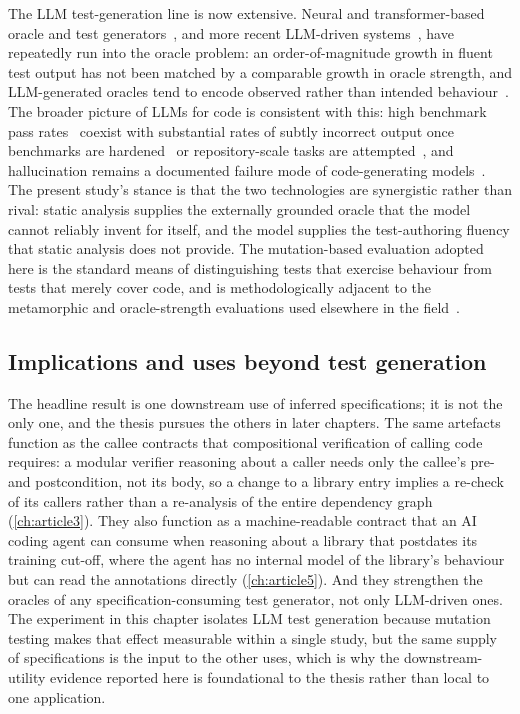 The LLM test-generation line is now extensive. Neural and transformer-based
oracle and test generators~\citep{tufano2020athenatest,watson2020atlas}, and more
recent LLM-driven systems~\citep{yuan2024chattester,schafer2024testpilot}, have
repeatedly run into the oracle problem: an order-of-magnitude growth in fluent test
output has not been matched by a comparable growth in oracle strength, and
LLM-generated oracles tend to encode observed rather than intended
behaviour~\citep{liu2026oracle}. The broader picture of LLMs for code is
consistent with this: high benchmark pass rates~\citep{chen2021codex,austin2021mbpp,li2022alphacode}
coexist with substantial rates of subtly incorrect output once benchmarks are
hardened~\citep{liu2023evalplus} or repository-scale tasks are
attempted~\citep{jimenez2024swebench}, and hallucination remains a documented
failure mode of code-generating models~\citep{zhang2025hallucination}. The present
study's stance is that the two technologies are synergistic rather than rival:
static analysis supplies the externally grounded oracle that the model cannot
reliably invent for itself, and the model supplies the test-authoring fluency that
static analysis does not provide. The mutation-based evaluation adopted here is the
standard means of distinguishing tests that exercise behaviour from tests that
merely cover code, and is methodologically adjacent to the metamorphic and
oracle-strength evaluations used elsewhere in the
field~\citep{segura2016metamorphic,chen2018metamorphic}.

\subsection{Implications and uses beyond test generation}
\label{sec:art1:implications}

The headline result is one downstream use of inferred specifications; it is not
the only one, and the thesis pursues the others in later chapters. The same
artefacts function as the callee contracts that compositional verification of
calling code requires: a modular verifier reasoning about a caller needs only the
callee's pre- and postcondition, not its body, so a change to a library entry
implies a re-check of its callers rather than a re-analysis of the entire
dependency graph (\cref{ch:article3}). They also function as a machine-readable
contract that an AI coding agent can consume when reasoning about a library that
postdates its training cut-off, where the agent has no internal model of the
library's behaviour but can read the annotations directly (\cref{ch:article5}). And
they strengthen the oracles of any specification-consuming test generator, not only
LLM-driven ones. The experiment in this chapter isolates LLM test generation
because mutation testing makes that effect measurable within a single study, but
the same supply of specifications is the input to the other uses, which is why the
downstream-utility evidence reported here is foundational to the thesis rather than
local to one application.


